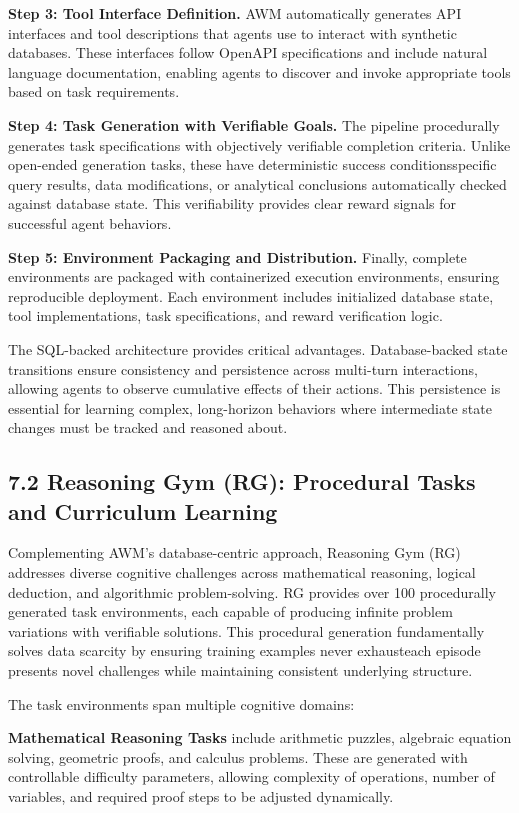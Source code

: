 \textbf{Step 3: Tool Interface Definition.} AWM automatically generates API interfaces and tool descriptions that agents use to interact with synthetic databases. These interfaces follow OpenAPI specifications and include natural language documentation, enabling agents to discover and invoke appropriate tools based on task requirements.

\textbf{Step 4: Task Generation with Verifiable Goals.} The pipeline procedurally generates task specifications with objectively verifiable completion criteria. Unlike open-ended generation tasks, these have deterministic success conditionsspecific query results, data modifications, or analytical conclusions automatically checked against database state. This verifiability provides clear reward signals for successful agent behaviors.

\textbf{Step 5: Environment Packaging and Distribution.} Finally, complete environments are packaged with containerized execution environments, ensuring reproducible deployment. Each environment includes initialized database state, tool implementations, task specifications, and reward verification logic.

The SQL-backed architecture provides critical advantages. Database-backed state transitions ensure consistency and persistence across multi-turn interactions, allowing agents to observe cumulative effects of their actions. This persistence is essential for learning complex, long-horizon behaviors where intermediate state changes must be tracked and reasoned about.

\subsection{7.2 Reasoning Gym (RG): Procedural Tasks and Curriculum Learning}

Complementing AWM's database-centric approach, Reasoning Gym (RG) addresses diverse cognitive challenges across mathematical reasoning, logical deduction, and algorithmic problem-solving. RG provides over 100 procedurally generated task environments, each capable of producing infinite problem variations with verifiable solutions. This procedural generation fundamentally solves data scarcity by ensuring training examples never exhausteach episode presents novel challenges while maintaining consistent underlying structure.

The task environments span multiple cognitive domains:

\textbf{Mathematical Reasoning Tasks} include arithmetic puzzles, algebraic equation solving, geometric proofs, and calculus problems. These are generated with controllable difficulty parameters, allowing complexity of operations, number of variables, and required proof steps to be adjusted dynamically.

